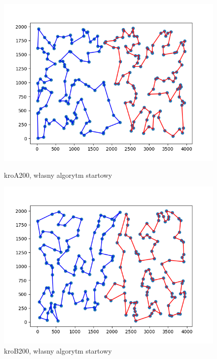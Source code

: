 \documentclass[11pt]{article}
\begin{document}
\begin{figure}[H]
    \vspace{0.5cm}

    \begin{minipage}[t]{0.45\textwidth}
        \centering
        \includegraphics[width=\linewidth]{best_paths/kroA200/traverse_greedy_edge/split_paths_regret_TSP}
        \caption{kroA200, własny algorytm startowy}
    \end{minipage}
    \hfill
    \begin{minipage}[t]{0.45\textwidth}
        \centering
        \includegraphics[width=\linewidth]{best_paths/kroB200/traverse_greedy_edge/split_paths_regret_TSP}
        \caption{kroB200, własny algorytm startowy}
    \end{minipage}
    \label{fig:minipage-greedy-edge}
\end{figure}
\end{document}
